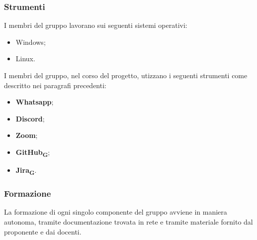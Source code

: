 	\subsubsection{Strumenti}
	I membri del gruppo lavorano sui seguenti sistemi operativi:
	\begin{itemize}
	\item Windows;
	\item Linux.
	\end{itemize}
	I membri del gruppo, nel corso del progetto, utizzano i seguenti strumenti come descritto nei paragrafi precedenti:
	\begin{itemize}
	\item \textbf{Whatsapp};
	\item \textbf{Discord};
	\item \textbf{Zoom};
	\item \textbf{GitHub\textsubscript{G}};
	\item \textbf{Jira\textsubscript{G}}.
	\end{itemize}

	\subsubsection{Formazione}
	La formazione di ogni singolo componente del gruppo avviene in maniera autonoma, tramite documentazione trovata in rete e tramite materiale fornito dal proponente e dai docenti.